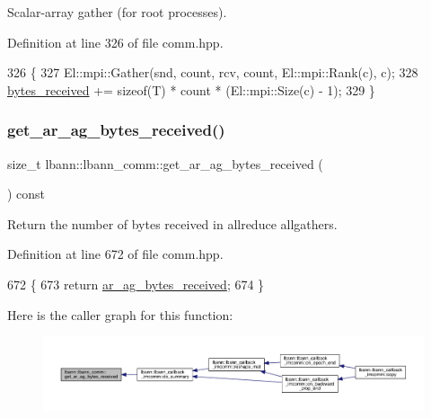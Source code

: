 Scalar-\/array gather (for root processes). 

Definition at line 326 of file comm.\+hpp.


\begin{DoxyCode}
326                                                             \{
327     El::mpi::Gather(snd, count, rcv, count, El::mpi::Rank(c), c);
328     \hyperlink{classlbann_1_1lbann__comm_afb99f57f7eafc0695bf28e6c26a8120f}{bytes\_received} += \textcolor{keyword}{sizeof}(T) * count * (El::mpi::Size(c) - 1);
329   \}
\end{DoxyCode}
\mbox{\label{classlbann_1_1lbann__comm_a7aaeb171cd6f08926a6919e9a7892a73}} 
\subsubsection{\texorpdfstring{get\+\_\+ar\+\_\+ag\+\_\+bytes\+\_\+received()}{get\_ar\_ag\_bytes\_received()}}
{\footnotesize\ttfamily size\+\_\+t lbann\+::lbann\+\_\+comm\+::get\+\_\+ar\+\_\+ag\+\_\+bytes\+\_\+received (\begin{DoxyParamCaption}{ }\end{DoxyParamCaption}) const\hspace{0.3cm}{\ttfamily [inline]}}

Return the number of bytes received in allreduce allgathers. 

Definition at line 672 of file comm.\+hpp.


\begin{DoxyCode}
672                                                  \{
673     \textcolor{keywordflow}{return} \hyperlink{classlbann_1_1lbann__comm_afded6f478dc5021d1edec306dc6c528c}{ar\_ag\_bytes\_received};
674   \}
\end{DoxyCode}
Here is the caller graph for this function\+:\nopagebreak
\begin{figure}[H]
\begin{center}
\leavevmode
\includegraphics[width=350pt]{classlbann_1_1lbann__comm_a7aaeb171cd6f08926a6919e9a7892a73_icgraph}
\end{center}
\end{figure}
\mbox{\label{classlbann_1_1lbann__comm_af745b91711014bf5a9f8d2466b5a6634}} 
